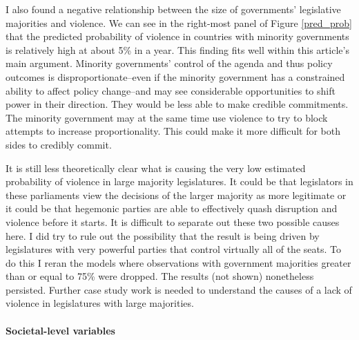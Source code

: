 \documentclass[a4paper]{article}\usepackage[]{graphicx}\usepackage[]{color}
\begin{document}
I also found a negative relationship between the size of governments' legislative majorities and violence. We can see in the right-most panel of Figure \ref{pred_prob} that the predicted probability of violence in countries with minority governments is relatively high at about 5\% in a year. This finding fits well within this article's main argument. Minority governments' control of the agenda and thus policy outcomes is disproportionate--even if the minority government has a constrained ability to affect policy change--and may see considerable opportunities to shift power in their direction. They would be less able to make credible commitments. The minority government may at the same time use violence to try to block attempts to increase proportionality. This could make it more difficult for both sides to credibly commit.

It is still less theoretically clear what is causing the very low estimated probability of violence in large majority legislatures. It could be that legislators in these parliaments view the decisions of the larger majority as more legitimate or it could be that hegemonic parties are able to effectively quash disruption and violence before it starts. It is difficult to separate out these two possible causes here. I did try to rule out the possibility that the result is being driven by legislatures with very powerful parties that control virtually all of the seats. To do this I reran the models where observations with government majorities greater than or equal to 75\% were dropped. The results (not shown) nonetheless persisted. Further case study work is needed to understand the causes of a lack of violence in legislatures with large majorities.

\paragraph{Societal-level variables}
\end{document}

